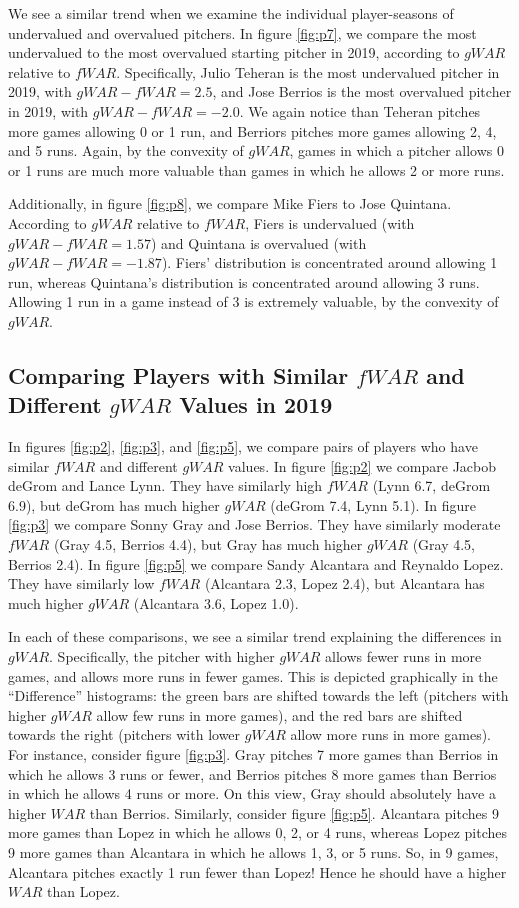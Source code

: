 \documentclass[12pt]{article}
\begin{document}
We see a similar trend when we examine the individual player-seasons of undervalued and overvalued pitchers. In figure \ref{fig:p7}, we compare the most undervalued to the most overvalued starting pitcher in 2019, according to $gWAR$ relative to $fWAR$. Specifically, Julio Teheran is the most undervalued pitcher in 2019, with $gWAR - fWAR = 2.5$, and Jose Berrios is the most overvalued pitcher in 2019, with $gWAR - fWAR = -2.0$. We again notice than Teheran pitches more games allowing 0 or 1 run, and Berriors pitches more games allowing 2, 4, and 5 runs. Again, by the convexity of $gWAR$, games in which a pitcher allows 0 or 1 runs are much more valuable than games in which he allows 2 or more runs. 

Additionally, in figure \ref{fig:p8}, we compare Mike Fiers to Jose Quintana. According to $gWAR$ relative to $fWAR$, Fiers is undervalued (with $gWAR - fWAR = 1.57$) and Quintana is overvalued (with $gWAR - fWAR = -1.87$). Fiers' distribution is concentrated around allowing 1 run, whereas Quintana's distribution is concentrated around allowing 3 runs. Allowing 1 run in a game instead of 3 is extremely valuable, by the convexity of $gWAR$. 

\subsection{Comparing Players with Similar $fWAR$ and Different $gWAR$ Values in 2019}

In figures \ref{fig:p2}, \ref{fig:p3}, and \ref{fig:p5}, we compare pairs of players who have similar $fWAR$ and different $gWAR$ values. In figure \ref{fig:p2} we compare Jacbob deGrom and Lance Lynn. They have similarly high $fWAR$ (Lynn 6.7, deGrom 6.9), but deGrom has much higher $gWAR$ (deGrom 7.4, Lynn 5.1). In figure \ref{fig:p3} we compare Sonny Gray and Jose Berrios. They have similarly moderate $fWAR$ (Gray 4.5, Berrios 4.4), but Gray has much higher $gWAR$ (Gray 4.5, Berrios 2.4). In figure \ref{fig:p5} we compare Sandy Alcantara and Reynaldo Lopez. They have similarly low $fWAR$ (Alcantara 2.3, Lopez 2.4), but Alcantara has much higher $gWAR$ (Alcantara 3.6, Lopez 1.0). 

In each of these comparisons, we see a similar trend explaining the differences in $gWAR$. Specifically, the pitcher with higher $gWAR$ allows fewer runs in more games, and allows more runs in fewer games. This is depicted graphically in the ``Difference'' histograms: the green bars are shifted towards the left (pitchers with higher $gWAR$ allow few runs in more games), and the red bars are shifted towards the right (pitchers with lower $gWAR$ allow more runs in more games). For instance, consider figure \ref{fig:p3}. Gray pitches 7 more games than Berrios in which he allows 3 runs or fewer, and Berrios pitches 8 more games than Berrios in which he allows 4 runs or more. On this view, Gray should absolutely have a higher $WAR$ than Berrios. Similarly, consider figure \ref{fig:p5}. Alcantara pitches 9 more games than Lopez in which he allows 0, 2, or 4 runs, whereas Lopez pitches 9 more games than Alcantara in which he allows 1, 3, or 5 runs. So, in 9 games, Alcantara pitches exactly 1 run fewer than Lopez! Hence he should have a higher $WAR$ than Lopez. 
\end{document}

